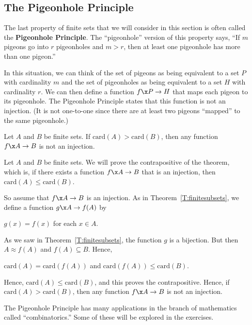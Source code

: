 \subsection*{The Pigeonhole Principle}

The last property of finite sets that we will consider in this section is often called the 
\textbf{Pigeonhole Principle}.
%
  The ``pigeonhole'' version of this property says,  ``If $m$ pigeons go into $r$ pigeonholes and $m > r$, then at least one pigeonhole has more than one pigeon.''

In this situation, we can think of the set of pigeons as being equivalent to a set $P$ with cardinality $m$ and the set of pigeonholes as being equivalent to a set $H$ with cardinality 
$r$.  We can then define a function $f\x P \to H$ that maps each pigeon to its pigeonhole.  The Pigeonhole Principle states that this function is not an injection.  (It is not one-to-one since there are at least two pigeons ``mapped'' to the same pigeonhole.)

\begin{theorem}  \label{T:pigeonhole}
Let $A$ and $B$ be finite sets.  If $\text{card} ( A ) > \text{card} ( B )$, then any function $f\x A \to B$ is not an injection.
\end{theorem}
%
\begin{myproof}
Let $A$ and $B$ be finite sets. We will prove the contrapositive of the theorem, which is, 
if there exists a function $f\x A \to B$ that is an injection, then 
$\text{card} ( A ) \leq \text{card} ( B )$.

So assume that $f\x A \to B$ is an injection.  As in Theorem~\ref{T:finitesubsets}, we define a function $g\x A \to f ( A )$ by 
\begin{center}
$g ( x ) = f ( x )$ for each $x \in A$.
\end{center}
As we saw in Theorem~\ref{T:finitesubsets}, the function $g$ is a bijection.  But then 
$A \approx f ( A )$ and $f ( A ) \subseteq B$.  Hence, 
\begin{center}
$\text{card} ( A ) = \text{card} \!\left( f ( A ) \right)$ and 
$\text{card} \!\left( f ( A ) \right) \leq \text{card} ( B )$.
\end{center}
Hence, $\text{card} ( A ) \leq \text{card} ( B )$, and this proves the contrapositive.  Hence, if $\text{card} ( A ) > \text{card} ( B )$, then  any function $f\x A \to B$  is not an injection.
\end{myproof}
The Pigeonhole Principle has many applications in the branch of mathematics called ``combinatorics.''  Some of these will be explored in the exercises.
\hbreak
{}%

\endinput
